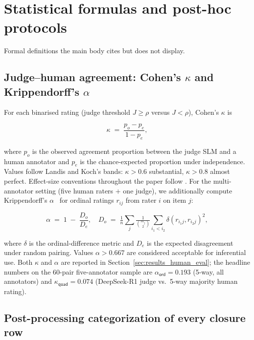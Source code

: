 \section{Statistical formulas and post-hoc protocols}
\label{sec:appendix_methodology}

Formal definitions the main body cites but does not display.

\subsection{Judge--human agreement: Cohen's $\kappa$ and Krippendorff's $\alpha$}
\label{sec:appendix_kappa_alpha}

For each binarised rating (judge threshold $J \geq \rho$ versus $J < \rho$),
Cohen's $\kappa$ is

\begin{equation}
  \kappa
  \;=\;
  \frac{p_o - p_e}{1 - p_e},
  \label{eq:kappa}
\end{equation}

where $p_o$ is the observed agreement proportion between the judge SLM
and a human annotator and $p_e$ is the chance-expected proportion under
independence. Values follow Landis and Koch's bands: $\kappa > 0.6$
substantial, $\kappa > 0.8$ almost perfect. Effect-size conventions
throughout the paper follow \citet{Cohen2013StatPower}. For the
multi-annotator setting (five human raters $+$ one judge), we
additionally compute Krippendorff's $\alpha$~\citep{Marzi2024KrippendorffAlpha}
for ordinal ratings $r_{ij}$ from rater $i$ on item $j$:

\begin{equation}
  \alpha
  \;=\;
  1 \;-\; \frac{D_o}{D_e},
  \quad
  D_o \;=\; \tfrac{1}{n}\sum_{j} \tfrac{1}{\binom{m_j}{2}}
            \sum_{i_1 < i_2} \delta(r_{i_1 j}, r_{i_2 j})^2,
  \label{eq:alpha}
\end{equation}

where $\delta$ is the ordinal-difference metric and $D_e$ is the
expected disagreement under random pairing. Values $\alpha > 0.667$
are considered acceptable for inferential use. Both $\kappa$ and
$\alpha$ are reported in Section~\ref{sec:results_human_eval}; the
headline numbers on the 60-pair five-annotator sample are
$\alpha_{\textsf{ord}} = 0.193$ (5-way, all annotators) and
$\kappa_{\textsf{quad}} = 0.074$ (DeepSeek-R1 judge vs.\ 5-way
majority human rating).

\subsection{Post-processing categorization of every closure row}
\label{sec:appendix_postproc}
\label{sec:experiment_setup_postproc}

